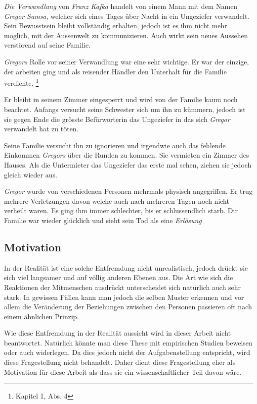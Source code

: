\documentclass[12pt,a4paper,twoside,titlepage]{article}
\begin{document}
	\textit{Die Verwandlung} von \textit{Franz Kafka} handelt von einem Mann mit dem Namen \textit{Gregor Samsa}, welcher sich eines Tages über Nacht in ein Ungeziefer verwandelt. Sein Bewusstsein bleibt vollständig erhalten, jedoch ist es ihm nicht mehr möglich, mit der Aussenwelt zu kommunizieren. Auch wirkt sein neues Aussehen verstörend auf seine Familie.
	
	\textit{Gregors} Rolle vor seiner Verwandlung war eine sehr wichtige. Er war der einzige, der arbeiten ging und als reisender Händler den Unterhalt für die Familie verdiente. \footnote{\cite{verwandlung} Kapitel 1, Abs. 4}
	
	Er bleibt in seinem Zimmer eingesperrt und wird von der Familie kaum noch beachtet. Anfangs versucht seine Schwester sich um ihn zu kümmern, jedoch ist sie gegen Ende die grösste Befürworterin das Ungeziefer in das sich \textit{Gregor} verwandelt hat zu töten.
	
	Seine Familie versucht ihn zu ignorieren und irgendwie auch das fehlende Einkommen \textit{Gregors} über die Runden zu kommen. Sie vermieten ein Zimmer des Hauses. Als die Untermieter das Ungeziefer das erste mal sehen, ziehen sie jedoch gleich wieder aus.
	
	\textit{Gregor} wurde von verschiedenen Personen mehrmals physisch angegriffen. Er trug mehrere Verletzungen davon welche auch nach mehreren Tagen noch nicht verheilt waren. Es ging ihm immer schlechter, bis er schlussendlich starb. Dir Familie war wieder glücklich und sieht sein Tod als eine \textit{Erlösung}
	
	\subsection{Motivation}
	
	In der Realität ist eine solche Entfremdung nicht unrealistisch, jedoch drückt sie sich viel langsamer und auf völlig anderen Ebenen aus. Die Art wie sich die Reaktionen der Mitmenschen ausdrückt unterscheidet sich natürlich auch sehr stark. In gewissen Fällen kann man jedoch die selben Muster erkennen und vor allem die Veränderung der Beziehungen zwischen den Personen passieren oft nach einem ähnlichen Prinzip. 
	
	Wie diese Entfremdung in der Realität aussieht wird in dieser Arbeit nicht beantwortet. Natürlich könnte man diese These mit empirischen Studien beweisen oder auch widerlegen. Da dies jedoch nicht der Aufgabenstellung entspricht, wird diese Fragestellung nicht behandelt. Daher dient diese Fragestellung eher als Motivation für diese Arbeit als dass sie ein wissenschaftlicher Teil davon wäre.
	
\end{document}
